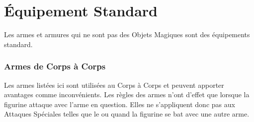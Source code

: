 
\part{Équipement Standard}
\label{mundane_equipment}

Les armes et armures qui ne sont pas des Objets Magiques sont des équipements standard.

\hypertarget{closecombatweapons}{\section{Armes de Corps à Corps}}
\label{close_combat_weapons}

Les armes listées ici sont utilisées au Corps à Corps et peuvent apporter avantages comme inconvénients. Les règles des armes n'ont d'effet que lorsque la figurine attaque avec l'arme en question. Elles ne s'appliquent donc pas aux Attaques Spéciales telles que le \stomp{} ou quand la figurine se bat avec une autre arme.


